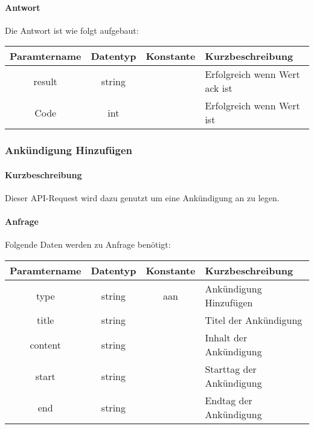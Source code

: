 \paragraph{Antwort}Die Antwort ist wie folgt aufgebaut:
\begin{table}[H]
	\begin{tabular}{|c|c|c|p{6.5cm}|}
		\hline
		\textbf{Paramtername} & \textbf{Datentyp} & \textbf{Konstante} & \textbf{Kurzbeschreibung}                                                                                               \\ \hline
		result              & string           &                 & Erfolgreich wenn Wert {\glqq ack\grqq} ist \\ \hline
		Code                & int              &                 & Erfolgreich wenn Wert {\glqq 0\grqq} ist \\ \hline
	\end{tabular}
\end{table}
\subsubsection{Ankündigung Hinzufügen}
\paragraph{Kurzbeschreibung}Dieser API-Request wird dazu genutzt um eine Ankündigung an zu legen.
\paragraph{Anfrage}Folgende Daten werden zu Anfrage benötigt:
\begin{table}[H]
	\begin{tabular}{|c|c|c|p{6.5cm}|}
		\hline
		\textbf{Paramtername} & \textbf{Datentyp} & \textbf{Konstante} & \textbf{Kurzbeschreibung}                                                                                               \\ \hline
		type                & string            & aan                & Ankündigung Hinzufügen \\ \hline
		title               & string            &                    & Titel der Ankündigung \\ \hline
		content             & string            &                    & Inhalt der Ankündigung \\ \hline
		start               & string            &                    & Starttag der Ankündigung \\ \hline
		end                 & string            &                    & Endtag  der Ankündigung \\ \hline
	\end{tabular}
\end{table}
